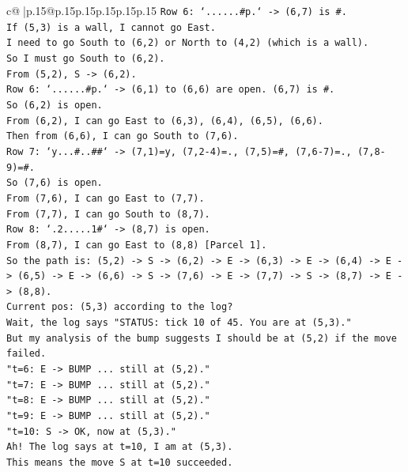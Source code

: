 \documentclass{article}
\begin{document}
{\begin{supertabular}{c@{$\;$}|p{.15\linewidth}@{}p{.15\linewidth}p{.15\linewidth}p{.15\linewidth}p{.15\linewidth}p{.15\linewidth}}
{{{\texttt{Row 6: `......\#p.` {-}> (6,7) is \#.} \\
\texttt{If (5,3) is a wall, I cannot go East.} \\
\texttt{I need to go South to (6,2) or North to (4,2) (which is a wall).} \\
\texttt{So I must go South to (6,2).} \\
\texttt{From (5,2), S {-}> (6,2).} \\
\texttt{Row 6: `......\#p.` {-}> (6,1) to (6,6) are open. (6,7) is \#.} \\
\texttt{So (6,2) is open.} \\
\texttt{From (6,2), I can go East to (6,3), (6,4), (6,5), (6,6).} \\
\texttt{Then from (6,6), I can go South to (7,6).} \\
\texttt{Row 7: `y...\#..\#\#` {-}> (7,1)=y, (7,2{-}4)=., (7,5)=\#, (7,6{-}7)=., (7,8{-}9)=\#.} \\
\texttt{So (7,6) is open.} \\
\texttt{From (7,6), I can go East to (7,7).} \\
\texttt{From (7,7), I can go South to (8,7).} \\
\texttt{Row 8: `.2.....1\#` {-}> (8,7) is open.} \\
\texttt{From (8,7), I can go East to (8,8) {[}Parcel 1{]}.} \\
\texttt{So the path is: (5,2) {-}> S {-}> (6,2) {-}> E {-}> (6,3) {-}> E {-}> (6,4) {-}> E {-}> (6,5) {-}> E {-}> (6,6) {-}> S {-}> (7,6) {-}> E {-}> (7,7) {-}> S {-}> (8,7) {-}> E {-}> (8,8).} \\
\texttt{Current pos: (5,3) according to the log?} \\
\texttt{Wait, the log says "STATUS: tick 10 of 45. You are at (5,3)."} \\
\texttt{But my analysis of the bump suggests I should be at (5,2) if the move failed.} \\
\texttt{"t=6: E {-}> BUMP ... still at (5,2)."} \\
\texttt{"t=7: E {-}> BUMP ... still at (5,2)."} \\
\texttt{"t=8: E {-}> BUMP ... still at (5,2)."} \\
\texttt{"t=9: E {-}> BUMP ... still at (5,2)."} \\
\texttt{"t=10: S {-}> OK, now at (5,3)."} \\
\texttt{Ah! The log says at t=10, I am at (5,3).} \\
\texttt{This means the move S at t=10 succeeded.} \\
}}}
\end{supertabular}}
\end{document}
